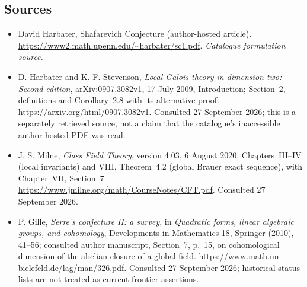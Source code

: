 \documentclass[11pt,a4paper]{article}
\numberwithin{equation}{section}
\begin{document}
\subsection{Sources}
\begin{itemize}\raggedright
\item[\textnormal{[S1]}]\hypertarget{source:statement:1}{} David Harbater, Shafarevich Conjecture (author-hosted article).
\url{https://www2.math.upenn.edu/~harbater/sc1.pdf}.
{\small\textit{Catalogue formulation source.}}
\item[\textnormal{[E1]}]\hypertarget{extra:statement:1}{}
D. Harbater and K. F. Stevenson, \emph{Local Galois theory in dimension
two: Second edition}, arXiv:0907.3082v1, 17 July 2009, Introduction;
Section~2, definitions and Corollary~2.8 with its alternative proof.
\url{https://arxiv.org/html/0907.3082v1}.
Consulted 27 September 2026; this is a separately retrieved source,
not a claim that the catalogue's inaccessible author-hosted PDF was read.
\item[\textnormal{[E2]}]\hypertarget{extra:statement:2}{}
J. S. Milne, \emph{Class Field Theory}, version 4.03, 6 August 2020,
Chapters~III--IV (local invariants) and VIII, Theorem~4.2 (global Brauer
exact sequence), with Chapter~VII, Section~7.
\url{https://www.jmilne.org/math/CourseNotes/CFT.pdf}.
Consulted 27 September 2026.
\item[\textnormal{[E3]}]\hypertarget{extra:statement:3}{}
P. Gille, \emph{Serre's conjecture II: a survey}, in \emph{Quadratic
forms, linear algebraic groups, and cohomology}, Developments in
Mathematics 18, Springer (2010), 41--56; consulted author manuscript,
Section~7, p.~15, on cohomological dimension of the abelian closure of a
global field. \url{https://www.math.uni-bielefeld.de/lag/man/326.pdf}.
Consulted 27 September 2026; historical status lists are not treated as
current frontier assertions.
\end{itemize}
\end{document}
